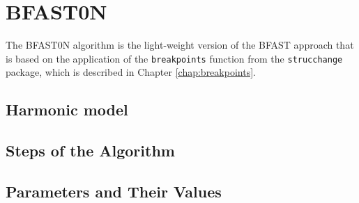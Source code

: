 \documentclass[main.tex]{subfiles}
\begin{document}
\chapter{BFAST0N}
\label{chap:bfast0n}
The BFAST0N algorithm is the light-weight version of the BFAST approach that is based on
the application of the \texttt{breakpoints} function from the
\texttt{strucchange} package, which is described in Chapter
\ref{chap:breakpoints}.
\section{Harmonic model}
\label{sec:harmonic_model}

\section{Steps of the Algorithm}
\label{sec:bfast0n_algorithm_steps}

\section{Parameters and Their Values}
\label{sec:bfast0n_params}

\biblio
\end{document}
